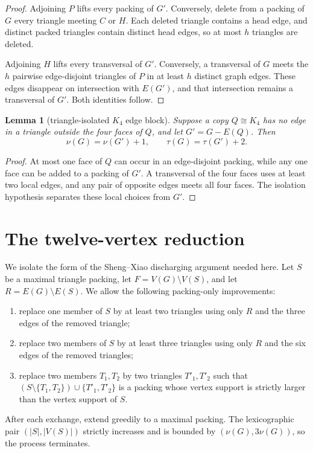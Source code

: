 \documentclass[11pt]{article}
\newtheorem{lemma}[theorem]{Lemma}
\theoremstyle{definition}
\begin{document}
\begin{proof}
Adjoining $P$ lifts every packing of $G'$.  Conversely, delete from a packing
of $G$ every triangle meeting $C$ or $H$.  Each deleted triangle contains a
head edge, and distinct packed triangles contain distinct head edges, so at
most $h$ triangles are deleted.

Adjoining $H$ lifts every transversal of $G'$.  Conversely, a transversal of
$G$ meets the $h$ pairwise edge-disjoint triangles of $P$ in at least $h$
distinct graph edges.  These edges disappear on intersection with $E(G')$,
and that intersection remains a transversal of $G'$.  Both identities follow.
\end{proof}

\begin{lemma}[triangle-isolated $K_4$ edge block]\label{lem:k4-offset}
Suppose a copy $Q\cong K_4$ has no edge in a triangle outside the four faces
of $Q$, and let $G'=G-E(Q)$.  Then
\[
  \nu(G)=\nu(G')+1,
  \qquad
  \tau(G)=\tau(G')+2.
\]
\end{lemma}

\begin{proof}
At most one face of $Q$ can occur in an edge-disjoint packing, while any one
face can be added to a packing of $G'$.  A transversal of the four faces uses
at least two local edges, and any pair of opposite edges meets all four faces.
The isolation hypothesis separates these local choices from $G'$.
\end{proof}

\section{The twelve-vertex reduction}\label{sec:reduction}

We isolate the form of the Sheng--Xiao discharging argument needed here.  Let
$S$ be a maximal triangle packing, let $F=V(G)\setminus V(S)$, and let
$R=E(G)\setminus E(S)$.  We allow the following packing-only improvements:
\begin{enumerate}[label=(E\arabic*)]
  \item replace one member of $S$ by at least two triangles using only $R$
        and the three edges of the removed triangle;
  \item replace two members of $S$ by at least three triangles using only
        $R$ and the six edges of the removed triangles;
  \item replace two members $T_1,T_2$ by two triangles $T'_1,T'_2$ such that
        $(S\setminus\{T_1,T_2\})\cup\{T'_1,T'_2\}$ is a packing whose vertex
        support is strictly larger than the vertex support of $S$.
\end{enumerate}
After each exchange, extend greedily to a maximal packing.  The lexicographic
pair $(|S|,|V(S)|)$ strictly increases and is bounded by
$(\nu(G),3\nu(G))$, so the process terminates.
\end{document}
